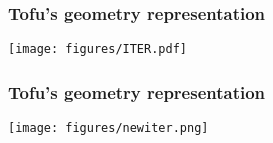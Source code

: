 \documentclass[10pt]{beamer}
\begin{document}
\begin{frame}
\frametitle{Tofu's geometry representation}

\begin{center}
	\texttt{[image: figures/ITER.pdf]}
\end{center}

\end{frame}

\begin{frame}
\frametitle{Tofu's geometry representation}

\begin{center}
	\texttt{[image: figures/newiter.png]}
\end{center}

\end{frame}


%
%
\end{document}
